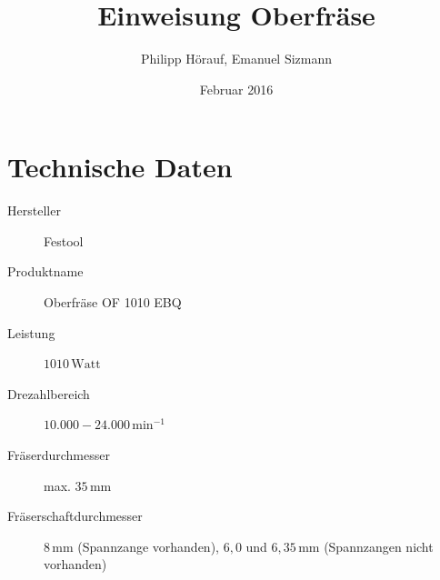 \documentclass{\basedir/fablab-document}
\date{Februar 2016}
\author{Philipp Hörauf, Emanuel Sizmann}
\title{Einweisung Oberfräse}
\begin{document}
\dosecttoc
\faketableofcontents
{}


\section{Technische Daten}
\begin{description}
    \item[Hersteller] Festool
    \item[Produktname] Oberfräse OF 1010 EBQ
    \item[Leistung] $1010\,\mathrm{Watt}$
    \item[Drezahlbereich] $10.000 - 24.000\,\mathrm{min}^{-1}$
    \item[Fräserdurchmesser] max. $35\,\mathrm{mm}$
    \item[Fräserschaftdurchmesser] $8\,\mathrm{mm}$ (Spannzange vorhanden), $6,0$ und $6,35\,\mathrm{mm}$ (Spannzangen nicht vorhanden)
    
\end{description}
\end{document}
